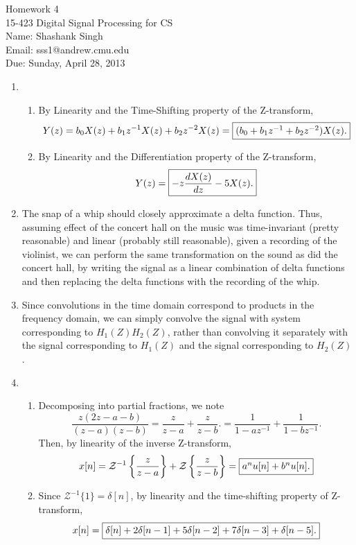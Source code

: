 \documentclass[11pt]{article}
\makeatletter
\newcommand{\myname}{Shashank Singh}
\newcommand{\myandrew}{sss1@andrew.cmu.edu}
\newcommand{\myclass}{15-423 Digital Signal Processing for CS}
\newcommand{\myhwnum}{4}
\newcommand{\duedate}{Sunday, April 28, 2013}
\newcommand{\inv}{^{-1}}
\newcommand{\Z}{\mathcal{Z}}            %
\makeatother
\begin{document}
\thispagestyle{plain}

{\Large Homework \myhwnum} \\
\myclass \\
Name: \myname \\
Email: \myandrew \\
Due: \duedate

\begin{enumerate}
\item
\begin{enumerate}
\item By Linearity and the Time-Shifting property of the Z-transform,
\[Y(z)
    = b_0X(z) + b_1z^{-1}X(z) + b_2z^{-2}X(z)
    = \mbox{\fbox{$(b_0 + b_1z^{-1} + b_2z^{-2})X(z)$.}}
\]

\item By Linearity and the Differentiation property of the Z-transform,
\[Y(z) = \mbox{\fbox{$\displaystyle -z\frac{dX(z)}{dz} - 5X(z)$.}}\]
\end{enumerate}

\item The snap of a whip should closely approximate a delta function. Thus,
assuming effect of the concert hall on the music was time-invariant (pretty
reasonable) and linear (probably still reasonable), given a recording of the
violinist, we can perform the same transformation on the sound as did the
concert hall, by writing the signal as a linear combination of delta functions
and then replacing the delta functions with the recording of the whip.

\item Since convolutions in the time domain correspond to products in the
frequency domain, we can simply convolve the signal with system corresponding
to $H_1(Z)H_2(Z)$, rather than convolving it separately with the signal
corresponding to $H_1(Z)$ and the signal corresponding to $H_2(Z)$.

\item
\begin{enumerate}
\item Decomposing into partial fractions, we note
\[\frac{z(2z - a - b)}{(z - a)(z - b)}
    = \frac{z}{z - a} + \frac{z}{z - b}.
    = \frac{1}{1 - az\inv} + \frac{1}{1 - bz\inv}.
\]
Then, by linearity of the inverse Z-transform,
\[x[n]
    = \Z\inv\left\{ \frac{z}{z - a} \right\}
    + \Z\left\{ \frac{z}{z - b} \right\}
    = \mbox{\fbox{$a^n u[n] + b^n u[n]$.}}
\]

\item Since $\Z\inv\{1\} = \delta[n]$, by linearity and the time-shifting
property of Z-transform,
\[x[n]
    = \mbox{\fbox{$\delta[n] + 2\delta[n - 1] + 5\delta[n - 2] + 7\delta[n - 3]
    + \delta[n - 5]$.}}
\]
\end{enumerate}


\end{enumerate}
\end{document}
